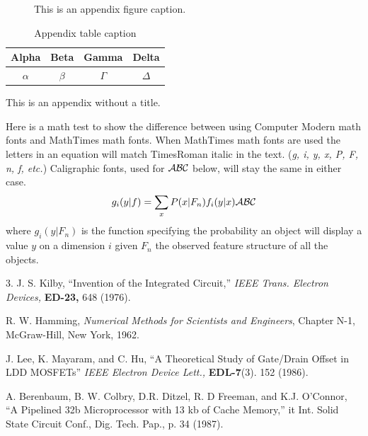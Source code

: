 \documentclass{wileySix}
\begin{document}
\begin{figure}[ht]
\caption{This is an appendix figure caption.}
\end{figure}


\begin{table}[ht]
\caption{Appendix table caption}
\centering
\begin{tabular}{cccc}
\hline
Alpha&Beta&Gamma&Delta\\
\hline
$\alpha$&$\beta$&$\Gamma$&$\Delta$\\
\hline
\end{tabular}
\end{table}


\appendix{}
This is an appendix without a title.

Here is a math test to show the difference between using Computer Modern
math fonts and MathTimes math fonts. When MathTimes math fonts are used
the letters in an equation will match TimesRoman italic in the text.
({\it g, i, y, x, P, F, n, f, etc.}) Caligraphic fonts, used for
$\cal ABC$ below, will stay the same
in either case.
\begin{equation}
g_i(y|f)=\sum_x P(x|F_n)f_i(y|x){\cal ABC}
\end{equation}
where $g_i(y|F_n)$ is the function specifying the probability an object will
display a value $y$ on a dimension $i$ given $F_n$ the observed feature
structure of all the objects.



\begin{references}{3.}
J. S. Kilby,
``Invention of the Integrated Circuit,'' {\it IEEE Trans. Electron Devices,}
{\bf ED-23,} 648 (1976).

R. W. Hamming,
                 {\it Numerical Methods for Scientists and
                 Engineers}, Chapter N-1, McGraw-Hill,
                 New York, 1962.

J. Lee, K. Mayaram, and C. Hu, ``A Theoretical
               Study of Gate/Drain Offset in LDD MOSFETs''
                     {\it IEEE Electron Device Lett.,} {\bf EDL-7}(3). 152
                     (1986).

A. Berenbaum,
B. W. Colbry, D.R. Ditzel, R. D Freeman, and
K.J. O'Connor, ``A Pipelined 32b Microprocessor with 13 kb of Cache Memory,''
{it Int. Solid State Circuit Conf., Dig. Tech. Pap.,} p. 34 (1987).
\end{references}
\end{document}
